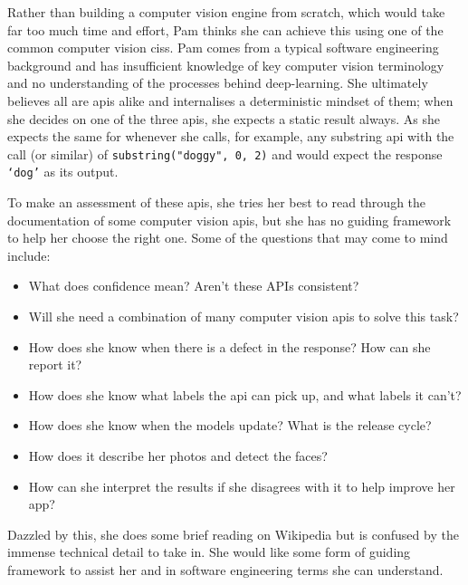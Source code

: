 Rather than building a computer vision engine from scratch, which would take far too much time and effort, Pam thinks she can achieve this using one of the common computer vision \glspl{cis}. Pam comes from a typical software engineering background and has insufficient knowledge of key computer vision terminology and no understanding of the processes behind deep-learning. She ultimately believes all are \glspl{api} alike and internalises a deterministic mindset of them; when she decides on one of the three \glspl{api}, she expects a static result always. As she expects the same for whenever she calls, for example, any substring \gls{api} with the call (or similar) of \texttt{substring("doggy", 0, 2)} and would expect the response \texttt{`dog'} as its output.

To make an assessment of these \glspl{api}, she tries her best to read through the documentation of some computer vision \glspl{api}, but she has no guiding framework to help her choose the right one. Some of the questions that may come to mind include:

\begin{itemize}
  \item What does confidence mean? Aren't these APIs consistent?
  \item Will she need a combination of many computer vision \glspl{api} to solve this task?
  \item How does she know when there is a defect in the response? How can she report it?
  \item How does she know what labels the \gls{api} can pick up, and what labels it can't?
  \item How does she know when the models update? What is the release cycle?
  \item How does it describe her photos and detect the faces?
  \item How can she interpret the results if she disagrees with it to help improve her app?
\end{itemize}

Dazzled by this, she does some brief reading on Wikipedia but is confused by the immense technical detail to take in. She would like some form of guiding framework to assist her and in software engineering terms she can understand.